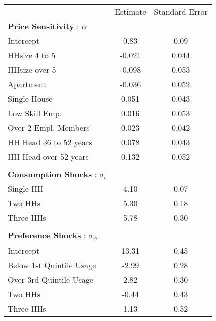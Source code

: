 \begin{tabular}{lcc}
& Estimate & Standard Error \\
\textbf{Price Sensitivity} : $\alpha$ & \multicolumn{2}{c}{}\\
Intercept &0.83&0.09\\
HHsize 4 to 5 &-0.021&0.044\\
HHsize over 5 &-0.098&0.053\\
Apartment &-0.036&0.052\\
Single House &0.051&0.043\\
Low Skill Emp. &0.016&0.053\\
Over 2 Empl. Members &0.023&0.042\\
HH Head 36 to 52 years  &0.078&0.043\\
HH Head over 52 years  &0.132&0.052\\
\multicolumn{3}{c}{} \\
\textbf{Consumption Shocks} : $\sigma_{\epsilon}$ & \multicolumn{2}{c}{}\\
Single HH &4.10&0.07\\
Two HHs &5.30&0.18\\
Three HHs &5.78&0.30\\
\multicolumn{3}{c}{} \\
\textbf{Preference Shocks} : $\sigma_{\psi}$ & \multicolumn{2}{c}{}\\
Intercept &13.31&0.45\\
Below 1st Quintile Usage &-2.99&0.28\\
Over 3rd Quintile Usage &2.82&0.30\\
Two HHs &-0.44&0.43\\
Three HHs &1.13&0.52\\
\end{tabular} 
